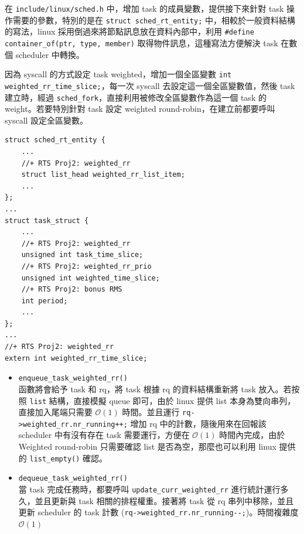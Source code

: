 \documentclass{res}
\begin{document}
\begin{resume}
在 \lstinline{include/linux/sched.h} 中，增加 task 的成員變數，提供接下來針對 task 操作需要的參數，特別的是在 \lstinline{struct sched_rt_entity;} 中，相較於一般資料結構的寫法，linux 採用倒過來將節點訊息放在資料內部中，利用 \lstinline{#define container_of(ptr, type, member)} 取得物件訊息，這種寫法方便解決 task 在數個 scheduler 中轉換。

因為 syscall 的方式設定 task weighted，增加一個全區變數 \lstinline{int weighted_rr_time_slice;}，每一次 syscall 去設定這一個全區變數值，然後 task 建立時，經過 \lstinline{sched_fork}，直接利用被修改全區變數作為這一個 task 的 weight。若要特別針對 task 設定 weighted round-robin，在建立前都要呼叫 syscall 設定全區變數。

\begin{lstlisting}[frame=single]
struct sched_rt_entity {
    ...
    //+ RTS Proj2: weighted_rr
    struct list_head weighted_rr_list_item;
    ...
};
...
struct task_struct {
    ...
    //+ RTS Proj2: weighted_rr
    unsigned int task_time_slice;
    //+ RTS Proj2: weighted_rr_prio
    unsigned int weighted_time_slice;
    //+ RTS Proj2: bonus RMS
    int period;
    ...
};
...
//+ RTS Proj2: weighted_rr
extern int weighted_rr_time_slice;
\end{lstlisting}

\vspace*{.1in} 

\vspace*{.05in} \hspace*{.1in} 

\begin{itemize}
	\item 
	\lstinline{enqueue_task_weighted_rr()} \\
	函數將會給予 task 和 rq，將 task 根據 rq 的資料結構重新將 task 放入。若按照 \lstinline{list} 結構，直接模擬 queue 即可，由於 linux 提供 list 本身為雙向串列，直接加入尾端只需要 $\mathcal{O}(1)$ 時間。並且運行 \lstinline{rq->weighted_rr.nr_running++;} 增加 rq 中的計數，隨後用來在回報該 scheduler 中有沒有存在 task 需要運行，方便在 $\mathcal{O}(1)$ 時間內完成，由於 Weighted round-robin 只需要確認 list 是否為空，那麼也可以利用 linux 提供的 \lstinline{list_empty()} 確認。
	
	\item
	\lstinline{dequeue_task_weighted_rr()} \\
	當 task 完成任務時，都要呼叫 \lstinline{update_curr_weighted_rr} 進行統計運行多久，並且更新與 task 相關的排程權重。接著將 task 從 rq 串列中移除，並且更新 scheduler 的 task 計數 (\lstinline{rq->weighted_rr.nr_running--;})。時間複雜度 $\mathcal{O}(1)$
	

\end{itemize}
\end{resume}
\end{document}
